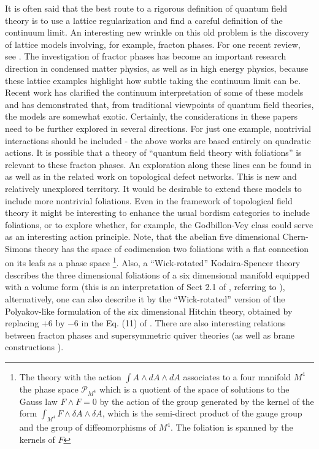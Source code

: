 \documentclass[12pt]{article}
\newcommand\CalP{\mathcal{P}}
\begin{document}
 It is often said that the best route to a
rigorous definition of quantum field theory 
is to use a lattice regularization and find a
careful definition of the continuum limit.
An interesting new wrinkle on this old problem is the
 discovery of lattice models involving, for example, fracton phases. 
 For one recent review, see \cite{Pretko:2020cko}.
The investigation of fractor phases has become an important  research direction
 in condensed matter physics, as well as  in high energy physics, because
 these lattice examples  highlight how subtle taking the continuum limit can be.
Recent work  \cite{Gorantla:2021svj,Seiberg:2020bhn,Seiberg:2020cxy,Seiberg:2020wsg}
 has clarified the continuum interpretation
of some of these models and has demonstrated that, from traditional
viewpoints of quantum field theories, the models are somewhat exotic.
Certainly, the considerations in these papers need to be further explored
in several directions. For just one example, nontrivial interactions should be
included - the above works are based entirely on quadratic actions.
It is possible that a theory of ``quantum field theory with foliations''
is relevant to these fracton phases.  An exploration along these lines can be
found in \cite{Ma:2020svo,Shirley:2017suz,Shirley:2019uou} as well as in the related work \cite{Aasen:2020zru} on topological defect networks. This is
new and relatively unexplored territory. It would be desirable to extend these
models to include more nontrivial foliations. Even in the framework of topological
field theory it might be interesting to enhance the usual bordism categories to
include foliations, or to explore whether, for example, the Godbillon-Vey class
could serve as an interesting action principle. Note, that the abelian five dimensional 
Chern-Simons theory has the space of codimension two foliations with a flat connection on its leafs
as a phase space \cite{FNRS}\footnote{The theory with the action $\int A \wedge dA \wedge dA$ associates to a four manifold $M^4$ the phase space ${\CalP}_{M^{4}}$ which is a quotient of the space of solutions to the Gauss law $F \wedge F = 0$ by the action of the group generated by the kernel of the form $\int_{M^{4}} F \wedge {\delta}A \wedge {\delta}A$, which is the semi-direct product of the gauge group and the group of diffeomorphisms
of $M^4$. The foliation is spanned by the kernels of $F$}. Also, a ``Wick-rotated'' Kodaira-Spencer theory describes the three dimensional foliations
of a six dimensional manifold equipped with a volume form
(this is an interpretation of Sect 2.1 of \cite{Gopakumar:1998vy}, referring to \cite{BCOV:1994}),
alternatively, one can also describe it by the ``Wick-rotated'' version of the Polyakov-like formulation of the six dimensional Hitchin theory, obtained by 
replacing $+6$ by $-6$ in the Eq. (11) of \cite{Zth}. There are also interesting relations between fracton phases and supersymmetric quiver theories \cite{Razamat:2021jkx, Franco:2022ziy} (as well as brane constructions \cite{Geng:2021cmq}). 
\end{document}
